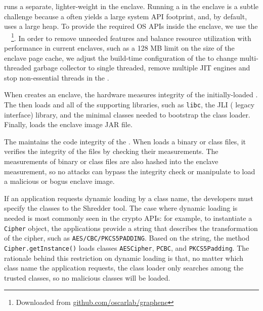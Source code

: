 \sysname{} runs a separate, lighter-weight \jvm{} in the enclave.
Running a \jvm{} in the enclave is a subtle challenge because a \jvm{}
often yields a large system API footprint, and, by default, uses a large heap. %
To provide the required OS APIs inside the enclave, we use the \graphene{} \libos{}~\cite{tsai14graphene}~\footnote{Downloaded from \url{github.com/oscarlab/graphene}}.
In order to remove unneeded features and balance resource utilization with performance in current \sgx{} enclaves, such as
a 128 MB limit on the size of the enclave page cache,
we adjust the build-time configuration of the \jvm{} to change multi-threaded garbage collector to single threaded, remove multiple JIT engines and stop non-essential threads in the \jvm{}. 



When \sysname{} creates an enclave, the \sgx{} hardware measures integrity of the initially-loaded \libos{}.
The \libos{} then loads \jvmname{} and all of the supporting libraries,
such as {\tt libc},
the JLI (\java{} legacy interface) library, and the minimal \java{} classes needed to bootstrap the class loader.
Finally, \jvm{} loads the enclave image JAR file.

The \graphene{} \libos{} maintains the code integrity of the \jvm{}.
When \graphene{} loads a binary or class files,
it verifies the integrity of the files by checking their measurements.
The measurements of binary or class files are also
hashed into the enclave measurement,
so no attacks can bypass the integrity check or manipulate \graphene{} to load  a malicious \jvm{} or bogus enclave image.

If an application requests dynamic loading by a class name,
the developers must specify the classes to the Shredder tool.
The case where dynamic loading is needed is most commonly seen in the crypto APIs:
for example, to instantiate a {\tt Cipher} object,
the applications provide a string that describes the transformation
of the cipher, such as {\tt AES/CBC/PKCS5PADDING}.
Based on the string, the method {\tt Cipher.getInstance()} loads classes
{\tt AESCipher}, {\tt PCBC}, and {\tt PKCS5Padding}.
The rationale behind this restriction on dynamic loading is that, no matter
which class name the application requests,
the class loader only searches among the trusted classes,
so no malicious classes will be loaded.

